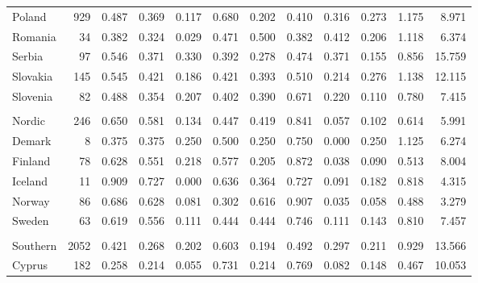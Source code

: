 \begin{tabular}{lrrrrrrrrrrr}
  \hspace{10mm} Poland &  929 & 0.487 & 0.369 & 0.117 & 0.680 & 0.202 & 0.410 & 0.316 & 0.273 & 1.175 & 8.971 \\ 
  \hspace{10mm} Romania &   34 & 0.382 & 0.324 & 0.029 & 0.471 & 0.500 & 0.382 & 0.412 & 0.206 & 1.118 & 6.374 \\ 
  \hspace{10mm} Serbia &   97 & 0.546 & 0.371 & 0.330 & 0.392 & 0.278 & 0.474 & 0.371 & 0.155 & 0.856 & 15.759 \\ 
  \hspace{10mm} Slovakia &  145 & 0.545 & 0.421 & 0.186 & 0.421 & 0.393 & 0.510 & 0.214 & 0.276 & 1.138 & 12.115 \\ 
  \hspace{10mm} Slovenia &   82 & 0.488 & 0.354 & 0.207 & 0.402 & 0.390 & 0.671 & 0.220 & 0.110 & 0.780 & 7.415 \\ 
  \multicolumn{10}{l}{\phantom{empty}} \\
        \hspace{5mm} Nordic &  246 & 0.650 & 0.581 & 0.134 & 0.447 & 0.419 & 0.841 & 0.057 & 0.102 & 0.614 & 5.991 \\ 
  \hspace{10mm} Demark &    8 & 0.375 & 0.375 & 0.250 & 0.500 & 0.250 & 0.750 & 0.000 & 0.250 & 1.125 & 6.274 \\ 
  \hspace{10mm} Finland &   78 & 0.628 & 0.551 & 0.218 & 0.577 & 0.205 & 0.872 & 0.038 & 0.090 & 0.513 & 8.004 \\ 
  \hspace{10mm} Iceland &   11 & 0.909 & 0.727 & 0.000 & 0.636 & 0.364 & 0.727 & 0.091 & 0.182 & 0.818 & 4.315 \\ 
  \hspace{10mm} Norway &   86 & 0.686 & 0.628 & 0.081 & 0.302 & 0.616 & 0.907 & 0.035 & 0.058 & 0.488 & 3.279 \\ 
  \hspace{10mm} Sweden &   63 & 0.619 & 0.556 & 0.111 & 0.444 & 0.444 & 0.746 & 0.111 & 0.143 & 0.810 & 7.457 \\ 
  \multicolumn{10}{l}{\phantom{empty}} \\
        \hspace{5mm} Southern & 2052 & 0.421 & 0.268 & 0.202 & 0.603 & 0.194 & 0.492 & 0.297 & 0.211 & 0.929 & 13.566 \\ 
  \hspace{10mm} Cyprus &  182 & 0.258 & 0.214 & 0.055 & 0.731 & 0.214 & 0.769 & 0.082 & 0.148 & 0.467 & 10.053 \\ 

\end{tabular}
